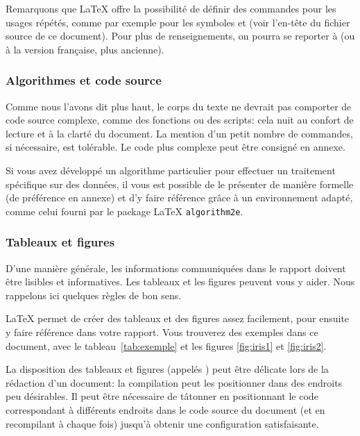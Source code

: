 \documentclass[twocolumn,10pt]{article}
\newcommand{\bsx}{\boldsymbol{x}}
\newcommand{\transp}[1]{{#1}^\top}
\begin{document}
Remarquons que \LaTeX{} offre la possibilité de définir des commandes pour les usages répétés, comme par exemple pour les symboles \frquote{$\bsx$} et \frquote{$\transp{}$} (voir l'en-tête du fichier source de ce document). Pour plus de renseignements, on pourra se reporter à \cite{oetiker18} (ou à la version française, plus ancienne). 



\subsubsection{Algorithmes et code source}\label{subsubsec:CR:code}

Comme nous l'avons dit plus haut, le corps du texte ne devrait pas comporter de code source complexe, comme des fonctions ou des scripts: cela nuit au confort de lecture et à la clarté du document. La mention d'un petit nombre de commandes, si nécessaire, est tolérable. Le code plus complexe peut être consigné en annexe. 

Si vous avez développé un algorithme particulier pour effectuer un traitement spécifique sur des données, il vous est possible de le présenter de manière formelle (de préférence en annexe) et d'y faire référence grâce à un environnement adapté, comme celui fourni par le package \LaTeX{} \verb?algorithm2e?. 



\subsubsection{Tableaux et figures}\label{subsubsec:CR:figures}

D'une manière générale, les informations communiquées dans le rapport doivent être lisibles et informatives. Les tableaux et les figures peuvent vous y aider. Nous rappelons ici quelques règles de bon sens. 

\LaTeX{} permet de créer des tableaux et des figures assez facilement, pour ensuite y faire référence dans votre rapport. Vous trouverez des exemples dans ce document, avec le tableau~\ref{tab:exemple} et les figures \ref{fig:iris1} et \ref{fig:iris2}. 

La disposition des tableaux et figures (appelés ) peut être délicate lors de la rédaction d'un document: la compilation peut les positionner dans des endroits peu désirables. 
Il peut être nécessaire de tâtonner en positionnant le code correspondant à différents endroits dans le code source du document (et en recompilant à chaque fois) jusqu'à obtenir une configuration satisfaisante. 
\end{document}
